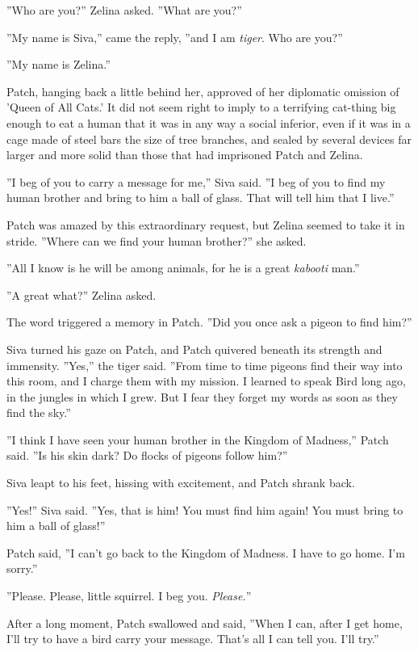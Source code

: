 \documentclass[12pt]{book}
\begin{document}
''Who are you?'' Zelina asked. ''What are you?''

''My name is Siva,'' came the reply, ''and I am {\it tiger}. Who are you?''

''My name is Zelina.''

Patch, hanging back a little behind her, approved of her diplomatic omission of 'Queen of All Cats.' It did not seem right to imply to a terrifying cat-thing big enough to eat a human that it was in any way a social inferior, even if it was in a cage made of steel bars the size of tree branches, and sealed by several devices far larger and more solid than those that had imprisoned Patch and Zelina.

''I beg of you to carry a message for me,'' Siva said. ''I beg of you to find my human brother and bring to him a ball of glass. That will tell him that I live.''

Patch was amazed by this extraordinary request, but Zelina seemed to take it in stride. ''Where can we find your human brother?'' she asked.

''All I know is he will be among animals, for he is a great {\it kabooti} man.''

''A great what?'' Zelina asked.

The word triggered a memory in Patch. ''Did you once ask a pigeon to find him?''

Siva turned his gaze on Patch, and Patch quivered beneath its strength and immensity. ''Yes,'' the tiger said. ''From time to time pigeons find their way into this room, and I charge them with my mission. I learned to speak Bird long ago, in the jungles in which I grew. But I fear they forget my words as soon as they find the sky.''

''I think I have seen your human brother in the Kingdom of Madness,'' Patch said. ''Is his skin dark? Do flocks of pigeons follow him?''

Siva leapt to his feet, hissing with excitement, and Patch shrank back.

''Yes!'' Siva said. ''Yes, that is him! You must find him again! You must bring to him a ball of glass!''

Patch said, ''I can't go back to the Kingdom of Madness. I have to go home. I'm sorry.''

''Please. Please, little squirrel. I beg you. {\it Please.}''

After a long moment, Patch swallowed and said, ''When I can, after I get home, I'll try to have a bird carry your message. That's all I can tell you. I'll try.''
\end{document}

